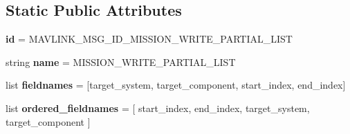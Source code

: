 \subsection*{Static Public Attributes}
\begin{DoxyCompactItemize}
\item 
\mbox{\label{classpymavlink_1_1dialects_1_1v10_1_1MAVLink__mission__write__partial__list__message_a644b977e11463aa3bcdf179ab52e240f}} 
{\bfseries id} = M\+A\+V\+L\+I\+N\+K\+\_\+\+M\+S\+G\+\_\+\+I\+D\+\_\+\+M\+I\+S\+S\+I\+O\+N\+\_\+\+W\+R\+I\+T\+E\+\_\+\+P\+A\+R\+T\+I\+A\+L\+\_\+\+L\+I\+ST
\item 
\mbox{\label{classpymavlink_1_1dialects_1_1v10_1_1MAVLink__mission__write__partial__list__message_ad5d8b973c838731ecaf5630ff785286a}} 
string {\bfseries name} = \textquotesingle{}M\+I\+S\+S\+I\+O\+N\+\_\+\+W\+R\+I\+T\+E\+\_\+\+P\+A\+R\+T\+I\+A\+L\+\_\+\+L\+I\+ST\textquotesingle{}
\item 
\mbox{\label{classpymavlink_1_1dialects_1_1v10_1_1MAVLink__mission__write__partial__list__message_ae22e9aa696b093fddd954cb8d2a4f390}} 
list {\bfseries fieldnames} = \mbox{[}\textquotesingle{}target\+\_\+system\textquotesingle{}, \textquotesingle{}target\+\_\+component\textquotesingle{}, \textquotesingle{}start\+\_\+index\textquotesingle{}, \textquotesingle{}end\+\_\+index\textquotesingle{}\mbox{]}
\item 
\mbox{\label{classpymavlink_1_1dialects_1_1v10_1_1MAVLink__mission__write__partial__list__message_a231fff33bad93f358432d83ac4564e23}} 
list {\bfseries ordered\+\_\+fieldnames} = \mbox{[} \textquotesingle{}start\+\_\+index\textquotesingle{}, \textquotesingle{}end\+\_\+index\textquotesingle{}, \textquotesingle{}target\+\_\+system\textquotesingle{}, \textquotesingle{}target\+\_\+component\textquotesingle{} \mbox{]}
\item 
\mbox{\label{classpymavlink_1_1dialects_1_1v10_1_1MAVLink__mission__write__partial__list__message_a34ffb7d5fea15fd0f48eff456701f806}} 

\end{DoxyCompactItemize}
